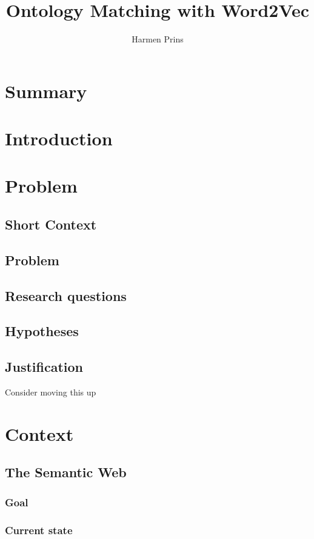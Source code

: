 \documentclass{article}
\title{Ontology Matching with Word2Vec}
\author{Harmen Prins}
\begin{document}
 \maketitle
 
 \section*{Summary}
 
 \tableofcontents
 
 \section{Introduction}

 \section{Problem}
 \subsection{Short Context}
 \subsection{Problem}
 \subsection{Research questions}
 \subsection{Hypotheses}
 \subsection{Justification}
 Consider moving this up
 
 \section{Context}
 \subsection{The Semantic Web}
 \subsubsection{Goal}
 \subsubsection{Current state}
\end{document}
